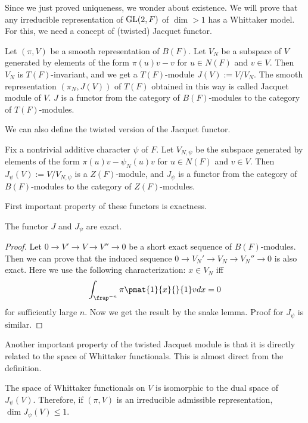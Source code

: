 Since we just proved uniqueness, we wonder about existence. We will prove that any irreducible representation of $\mathrm{GL}(2, F)$ of $\dim >1$ has a Whittaker model. For this, we need a concept of (twisted) Jacquet functor.
\begin{definition}
Let $(\pi, V)$ be a smooth representation of $B(F)$. Let $V_N$ be a subspace of $V$ generated by elements of the form $\pi(u)v - v$ for $u\in N(F)$ and $v\in V$. 
Then $V_N$ is $T(F)$-invariant, and we get a $T(F)$-module $J(V):= V/V_N$. The smooth representation $(\pi_N, J(V))$ of $T(F)$ obtained in this way is called Jacquet module of $V$. 
$J$ is a functor from the category of $B(F)$-modules to the category of $T(F)$-modules. 
\end{definition}
We can also define the twisted version of the Jacquet functor. 
\begin{definition}
Fix a nontrivial additive character $\psi$ of $F$. 
Let $V_{N, \psi}$ be the subspace generated by elements of the form $\pi(u)v - \psi_{N}(u)v$ for $u\in N(F)$ and $v\in V$. Then $J_{\psi}(V) := V/V_{N, \psi}$ is a $Z(F)$-module, and $J_{\psi}$ is a functor from the category of $B(F)$-modules to the category of $Z(F)$-modules. 
\end{definition}
First important property of these functors is exactness. 
\begin{proposition}
The functor $J$ and $J_{\psi}$ are exact. 
\end{proposition}
\begin{proof}
Let $0\to V'\to V\to V'' \to 0$ be a short exact sequence of $B(F)$-modules. 
Then we can prove that the induced sequence $0\to V_{N}' \to V_N \to V_{N}'' \to 0$ is also exact. Here we use the following characterization: $x\in V_N$ iff 
$$
\int_{\frap^{-n}} \pi\pmat{1}{x}{}{1} v dx = 0
$$
for sufficiently large $n$. Now we get the result by the snake lemma. 
Proof for $J_{\psi}$ is similar. 
\end{proof}

Another important property of the twisted Jacquet module is that it is directly related to the space of Whittaker functionals. This is almost direct from the definition. 
\begin{proposition}
The space of Whittaker functionals on $V$ is isomorphic to the dual space of $J_{\psi}(V)$. Therefore, if $(\pi, V)$ is an irreducible admissible representation, $\dim J_{\psi}(V) \leq 1$.
\end{proposition}

